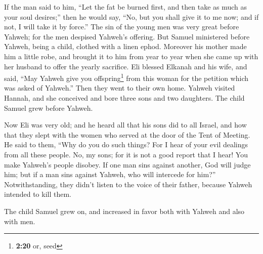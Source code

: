 \begin{paracol}{2}
\begin{otherlanguage}{english}
 If the man said to him, ``Let the fat be burned first,
and then take as much as your soul desires;'' then he would say, ``No,
but you shall give it to me now; and if not, I will take it by force.''
 The sin of the young men was very great before Yahweh;
for the men despised Yahweh's offering.  But Samuel
ministered before Yahweh, being a child, clothed with a linen ephod.
 Moreover his mother made him a little robe, and brought
it to him from year to year when she came up with her husband to offer
the yearly sacrifice.  Eli blessed Elkanah and his wife,
and said, ``May Yahweh give you offspring\footnote{\textbf{2:20} or,
  seed} from this woman for the petition which was asked of Yahweh.''
Then they went to their own home.  Yahweh visited Hannah,
and she conceived and bore three sons and two daughters. The child
Samuel grew before Yahweh.

 Now Eli was very old; and he heard all that his sons did
to all Israel, and how that they slept with the women who served at the
door of the Tent of Meeting.  He said to them, ``Why do
you do such things? For I hear of your evil dealings from all these
people.  No, my sons; for it is not a good report that I
hear! You make Yahweh's people disobey.  If one man sins
against another, God will judge him; but if a man sins against Yahweh,
who will intercede for him?'' Notwithstanding, they didn't listen to the
voice of their father, because Yahweh intended to kill them.

 The child Samuel grew on, and increased in favor both
with Yahweh and also with men.


\end{otherlanguage}
\end{paracol}
